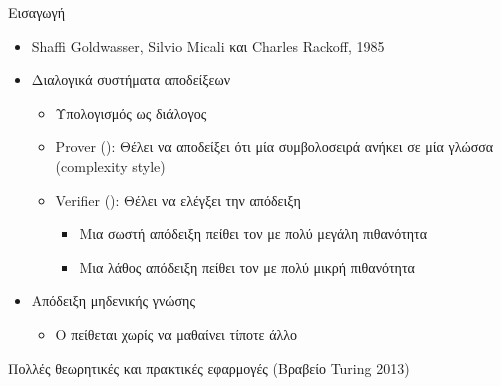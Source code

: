 \documentclass[handout]{beamer}
\begin{document}
\begin{frame}{Εισαγωγή}
\begin{itemize}
\item Shaffi Goldwasser, Silvio Micali και Charles Rackoff, 1985
\pause
\item Διαλογικά συστήματα αποδείξεων
\pause
\begin{itemize}
\item Υπολογισμός ως διάλογος
\pause
\item Prover (\prv): Θέλει να αποδείξει ότι μία συμβολοσειρά ανήκει σε μία γλώσσα (complexity style)
\pause
\item Verifier (\ver): Θέλει να ελέγξει την απόδειξη
\pause
\begin{itemize}
\item Μια σωστή απόδειξη πείθει τον \ver με πολύ μεγάλη πιθανότητα
\item Μια λάθος απόδειξη πείθει τον \ver με πολύ μικρή πιθανότητα
\end{itemize}
\end{itemize}
\item Απόδειξη μηδενικής γνώσης
\begin{itemize}
\item Ο \ver πείθεται χωρίς να μαθαίνει τίποτε άλλο 
\end{itemize}
\pause
\end{itemize}
Πολλές θεωρητικές και πρακτικές εφαρμογές (Βραβείο Turing 2013)
\end{frame}
\end{document}
